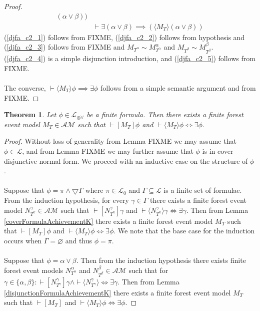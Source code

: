 \documentclass[12pt, a4paper, titlepage]{scrartcl}
\newtheorem{thm}{Theorem}[section]
\numberwithin{equation}{section}
\newcommand{\cover}{\bigtriangledown}
\newcommand{\sqex}[1]{[{#1}]}
\newcommand{\anex}[1]{\langle {#1} \rangle}
\newcommand{\lang}{\mathcal{L}}
\newcommand{\langArbAct}{\lang_{\otimes\forall}}
\newcommand{\langProp}{\lang_0}
\newcommand{\eventClass}{\mathcal{AM}}
\begin{document}
\begin{proof}
\begin{align}
			(\alpha \lor \beta))\label{djfa_c2_4}\\
	&\vdash \exists (\alpha \lor \beta) \implies (\anex{M_T} (\alpha \lor \beta))\label{djfa_c2_5}
\end{align}
(\ref{djfa_c2_1}) follows from FIXME, (\ref{djfa_c2_2}) follows from hypothesis and
(\ref{djfa_c2_3}) follows from FIXME and $M_{T^\alpha} \sim M^\alpha_{T^\alpha}$ and $M_{T^\beta}
\sim M^\beta_{T^\beta}$.
(\ref{djfa_c2_4}) is a simple disjunction introduction, and (\ref{djfa_c2_5}) follows from FIXME.\\
\\
The converse, $\vdash \anex{M_T} \phi \implies \exists \phi$ follows from a simple semantic
argument and from FIXME.
\end{proof}

\begin{thm} \label{goalAchievementK}
Let $\phi \in \langArbAct$ be a finite formula.
Then there exists a finite forest event model $M_T \in \eventClass$ such that
$\vdash \sqex{M_T}\phi$ and $\vdash \anex{ M_T } \phi \iff \exists \phi$.
\end{thm}

\begin{proof}
Without loss of generality from Lemma {FIXME} we may assume that $\phi \in \lang$, and from Lemma
{FIXME} we may further assume that $\phi$ is in cover disjunctive normal form.
We proceed with an inductive case on the structure of $\phi$.\\
\\
Suppose that $\phi = \pi \land \cover \Gamma$ where $\pi \in \langProp$ and $\Gamma \subseteq \lang$
is a finite set of formulae.
From the induction hypothesis, for every $\gamma \in \Gamma$ there exists a finite forest event
model $N^\gamma_{T^\gamma} \in \eventClass$ such that $\vdash \sqex{N^\gamma_{T^\gamma}} \gamma$ and
$\vdash \anex{N^\gamma_{T^\gamma}} \gamma \iff \exists \gamma$.
Then from Lemma \ref{coverFormulaAchievementK} there exists a finite forest event model $M_T$ such
that $\vdash \sqex{M_T} \phi$ and $\vdash \anex{M_T} \phi \iff \exists \phi$.
We note that the base case for the induction occurs when $\Gamma = \varnothing$ and thus $\phi =
\pi$.\\
\\
Suppose that $\phi = \alpha \lor \beta$.
Then from the induction hypothesis there exists finite forest event models $N^\alpha_{T^\alpha}$ and
$N^\beta_{T^\beta} \in \eventClass$ such that for $\gamma \in \{\alpha, \beta\}:
\vdash \sqex{N^\gamma_{T^\gamma}} \gamma \land \vdash \anex{N^\gamma_{T^\gamma}} \iff \exists
\gamma$.
Then from Lemma \ref{disjunctionFormulaAchievementK} there exists a finite forest event model $M_T$ such
that $\vdash \sqex{M_T}$ and $\vdash \anex{M_T} \phi \iff \exists \phi$.
\end{proof}
\end{document}
